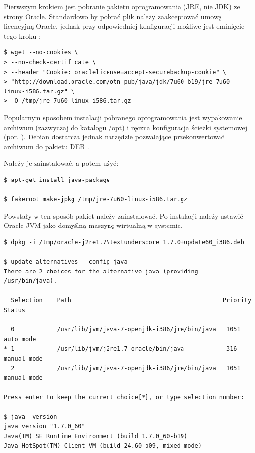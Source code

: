 \documentclass{article}
\begin{document}
Pierwszym krokiem jest pobranie pakietu oprogramowania (JRE, nie JDK) ze strony Oracle. Standardowo by pobrać plik należy zaakceptować umowę licencyjną Oracle, jednak przy odpowiedniej konfiguracji możliwe jest ominięcie tego kroku \cite{downloading_oracle_java}:

\begin{lstlisting}[style=bash, caption={pobieranie Oracle JRE}]
$ wget --no-cookies \
> --no-check-certificate \
> --header "Cookie: oraclelicense=accept-securebackup-cookie" \
> "http://download.oracle.com/otn-pub/java/jdk/7u60-b19/jre-7u60-linux-i586.tar.gz" \
> -O /tmp/jre-7u60-linux-i586.tar.gz
\end{lstlisting}

Popularnym sposobem instalacji pobranego oprogramowania jest wypakowanie archiwum (zazwyczaj do katalogu /opt) i ręczna konfiguracja ścieżki systemowej (por. \cite{downloading_oracle_java}). Debian dostarcza jednak narzędzie pozwalające przekonwertować archiwum do pakietu DEB \cite{installing_oracle_java_on_debian}.

Należy je zainstalować, a potem użyć:

\begin{lstlisting}[style=bash, caption={budowa pakietu DEB z Oracle JRE}]
$ apt-get install java-package

$ fakeroot make-jpkg /tmp/jre-7u60-linux-i586.tar.gz
\end{lstlisting}

Powstały w ten sposób pakiet należy zainstalować. Po instalacji należy ustawić Oracle JVM jako domyślną maszynę wirtualną w systemie.

\begin{lstlisting}[style=bash, caption={instalacja i konfiguracja Oracle JRE}]
$ dpkg -i /tmp/oracle-j2re1.7\textunderscore 1.7.0+update60_i386.deb

$ update-alternatives --config java
There are 2 choices for the alternative java (providing /usr/bin/java).

  Selection    Path                                           Priority   Status
------------------------------------------------------------
  0            /usr/lib/jvm/java-7-openjdk-i386/jre/bin/java   1051      auto mode
* 1            /usr/lib/jvm/j2re1.7-oracle/bin/java            316       manual mode
  2            /usr/lib/jvm/java-7-openjdk-i386/jre/bin/java   1051      manual mode

Press enter to keep the current choice[*], or type selection number:

$ java -version
java version "1.7.0_60"
Java(TM) SE Runtime Environment (build 1.7.0_60-b19)
Java HotSpot(TM) Client VM (build 24.60-b09, mixed mode)
\end{lstlisting}
\end{document}

